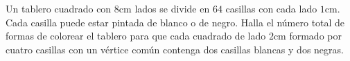Un tablero cuadrado con $8\text{cm}$ lados se divide en $64$ casillas con cada lado $1\text{cm}$. Cada casilla puede estar pintada de blanco o de negro. Halla el número total de formas de colorear el tablero para que cada cuadrado de lado $2\text{cm}$ formado por cuatro casillas con un vértice común contenga dos casillas blancas y dos negras.

